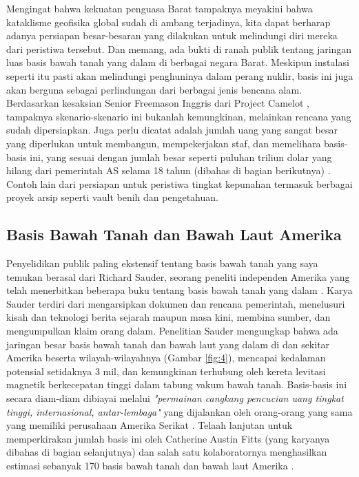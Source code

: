 \documentclass[10pt,twocolumn,letterpaper]{article}
\begin{document}
Mengingat bahwa kekuatan penguasa Barat tampaknya meyakini bahwa kataklisme geofisika global sudah di ambang terjadinya, kita dapat berharap adanya persiapan besar-besaran yang dilakukan untuk melindungi diri mereka dari peristiwa tersebut. Dan memang, ada bukti di ranah publik tentang jaringan luas basis bawah tanah yang dalam di berbagai negara Barat. Meskipun instalasi seperti itu pasti akan melindungi penghuninya dalam perang nuklir, basis ini juga akan berguna sebagai perlindungan dari berbagai jenis bencana alam. Berdasarkan kesaksian Senior Freemason Inggris dari Project Camelot \cite{4,6}, tampaknya skenario-skenario ini bukanlah kemungkinan, melainkan rencana yang sudah dipersiapkan. Juga perlu dicatat adalah jumlah uang yang sangat besar yang diperlukan untuk membangun, mempekerjakan staf, dan memelihara basis-basis ini, yang sesuai dengan jumlah besar seperti puluhan triliun dolar yang hilang dari pemerintah AS selama 18 tahun (dibahas di bagian berikutnya) \cite{11,12,13}. Contoh lain dari persiapan untuk peristiwa tingkat kepunahan termasuk berbagai proyek arsip seperti vault benih dan pengetahuan.

\subsection{Basis Bawah Tanah dan Bawah Laut Amerika}

Penyelidikan publik paling ekstensif tentang basis bawah tanah yang saya temukan berasal dari Richard Sauder, seorang peneliti independen Amerika yang telah menerbitkan beberapa buku tentang basis bawah tanah yang dalam \cite{22}. Karya Sauder terdiri dari mengarsipkan dokumen dan rencana pemerintah, menelusuri kisah dan teknologi berita sejarah maupun masa kini, membina sumber, dan mengumpulkan klaim orang dalam. Penelitian Sauder mengungkap bahwa ada jaringan besar basis bawah tanah dan bawah laut yang dalam di dan sekitar Amerika beserta wilayah-wilayahnya (Gambar \ref{fig:4}), mencapai kedalaman potensial setidaknya 3 mil, dan kemungkinan terhubung oleh kereta levitasi magnetik berkecepatan tinggi dalam tabung vakum bawah tanah. Basis-basis ini secara diam-diam dibiayai melalui \textit{"permainan cangkang pencucian uang tingkat tinggi, internasional, antar-lembaga"} yang dijalankan oleh orang-orang yang sama yang memiliki perusahaan Amerika Serikat \cite{22}. Telaah lanjutan untuk memperkirakan jumlah basis ini oleh Catherine Austin Fitts (yang karyanya dibahas di bagian selanjutnya) dan salah satu kolaboratornya menghasilkan estimasi sebanyak 170 basis bawah tanah dan bawah laut Amerika \cite{16,20}.
\end{document}
